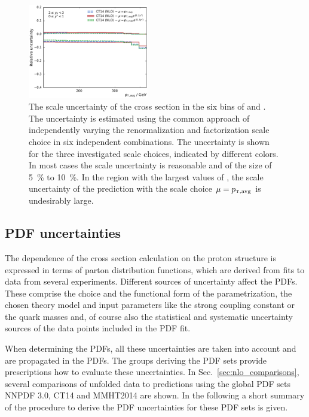 \begin{figure}[htp]
    \includegraphics[width=0.47\textwidth]{figures/theory/scale_uncert_comp_yb2ys0.pdf}
    \caption[Scale uncertainties of NLO calculation]{The scale uncertainty of
        the cross section in the six bins of \ystar and
        \yboost. The uncertainty is estimated using the common approach of
        independently varying the renormalization and factorization scale choice
        in six independent combinations. The uncertainty is shown for the three
        investigated scale choices, indicated by different colors. In most cases
        the scale uncertainty is reasonable and of the size of \SI{5}{\percent}
        to \SI{10}{\percent}. In
        the region with the largest values of \ystar, the scale uncertainty of
        the prediction with the scale choice $\mu=\ptavg$ is undesirably large.}
    \label{fig:scale_uncertainties}
\end{figure}

\subsection{PDF uncertainties}
\label{sec:pdf_uncertainties}

The dependence of the cross section calculation on the proton structure is
expressed in terms of parton distribution functions, which are derived from fits
to data from several experiments. Different sources of uncertainty affect the
PDFs. These comprise the choice and the functional form of the parametrization,
the chosen theory model and input parameters like the strong coupling constant
\as or the quark masses and, of course also the statistical and systematic
uncertainty sources of the data points included in the PDF fit.

When determining the PDFs, all these uncertainties are taken into account and
are propagated in the PDFs. The groups deriving the PDF sets provide
prescriptions how to evaluate these uncertainties. In
Sec.~\ref{sec:nlo_comparisons}, several comparisons of unfolded data to
predictions using the global PDF sets NNPDF 3.0, CT14 and MMHT2014 are shown. In
the following a short summary of the procedure to derive the PDF uncertainties
for these PDF sets is given.

